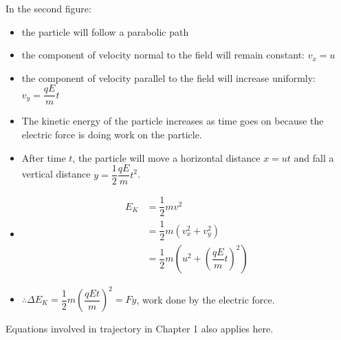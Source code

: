 \documentclass[a4paper,12pt]{article}
\begin{document}
\begin{center}
\begin{minipage}{0.48\textwidth}
  \end{minipage}
\end{center}
In the second figure:
\begin{itemize}
  \item the particle will follow a parabolic path
  \item the component of velocity normal to the field will remain constant: $v_x=u$
  \item the component of velocity parallel to the field will increase uniformly: $v_y=\dfrac{qE}{m}t$
  \item The kinetic energy of the particle increases as time goes on because the electric force is doing work on the particle.
  \item After time $t$, the particle will move a horizontal distance $x = ut$ and fall a vertical distance $y = \dfrac{1}{2}\dfrac{qE}{m}t^2$.
  \item $$ 
  \begin{aligned}
   E_K&= \dfrac{1}{2}mv^2\\
    &= \dfrac{1}{2}m\left(v_x^2+v_y^2\right)\\
    &= \dfrac{1}{2}m\left(u^2+\left(\dfrac{qE}{m}t\right)^2\right)
  \end{aligned} $$ 
  \item $\therefore \Delta E_K=\dfrac{1}{2}m\left(\dfrac{qEt}{m}\right)^2=Fy$, work done by the electric force.
\end{itemize}
Equations involved in trajectory in Chapter 1 also applies here. 
\end{document}
